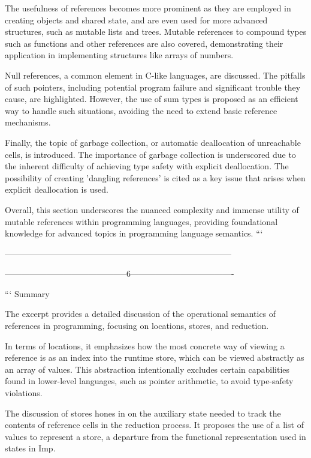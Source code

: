 The usefulness of references becomes more prominent as they are employed in creating objects and shared state, and are even used for more advanced structures, such as mutable lists and trees. Mutable references to compound types such as functions and other references are also covered, demonstrating their application in implementing structures like arrays of numbers.

Null references, a common element in C-like languages, are discussed. The pitfalls of such pointers, including potential program failure and significant trouble they cause, are highlighted. However, the use of sum types is proposed as an efficient way to handle such situations, avoiding the need to extend basic reference mechanisms.

Finally, the topic of garbage collection, or automatic deallocation of unreachable cells, is introduced. The importance of garbage collection is underscored due to the inherent difficulty of achieving type safety with explicit deallocation. The possibility of creating 'dangling references' is cited as a key issue that arises when explicit deallocation is used.

Overall, this section underscores the nuanced complexity and immense utility of mutable references within programming languages, providing foundational knowledge for advanced topics in programming language semantics.
```


---------------------------------------------------------------------------------

--------------------------------------------6-------------------------------------

```
Summary

The excerpt provides a detailed discussion of the operational semantics of references in programming, focusing on locations, stores, and reduction.

In terms of locations, it emphasizes how the most concrete way of viewing a reference is as an index into the runtime store, which can be viewed abstractly as an array of values. This abstraction intentionally excludes certain capabilities found in lower-level languages, such as pointer arithmetic, to avoid type-safety violations.

The discussion of stores hones in on the auxiliary state needed to track the contents of reference cells in the reduction process. It proposes the use of a list of values to represent a store, a departure from the functional representation used in states in Imp.

